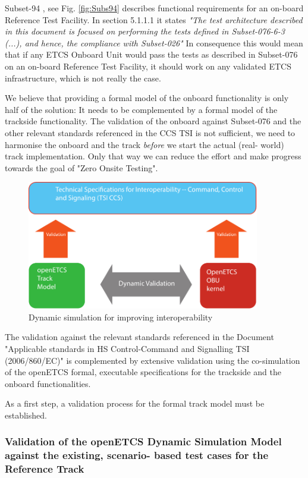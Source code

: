 \documentclass{template/openetcs_article}
\begin{document}
Subset-94 \cite{Subset094}, see Fig. \ref{fig:Subs94} describes functional requirements for an on-board Reference Test Facility. In section 5.1.1.1 it states \emph{"The test architecture described in this document is focused on performing the tests defined in Subset-076-6-3 (...), and hence, the compliance with Subset-026"} In consequence this would mean that if any ETCS Onboard Unit would pass the tests as described in Subset-076 \cite{Subset076} on an on-board Reference Test Facility, it should work on any validated ETCS infrastructure, which is not really the case.

We believe that providing a formal model of the onboard functionality is only half of the solution: It needs to be complemented by a formal model of the trackside functionality. The validation of the onboard against Subset-076 and the other relevant standards referenced in the CCS TSI is not sufficient, we need to harmonise the onboard and the track \emph{before} we start the actual (real- world) track implementation. Only that way we can reduce the effort and make progress towards the goal of "Zero Onsite Testing".

\begin{figure}[H]
 \centering
  \includegraphics[width=4in]{images/DynamicSimulationForInterOp}
  \caption{Dynamic simulation for improving interoperability}
   \label{fig:InterOpDynSim}
\end{figure}

The validation against the relevant standards referenced in the Document "Applicable standards in HS Control-Command and Signalling TSI (2006/860/EC)" \cite{CCS-TSI} is complemented by extensive validation using the co-simulation of the openETCS formal, executable specifications for the trackside and the onboard functionalities. 

As a first step, a validation process for the formal track model must be established. 


\subsubsection{Validation of the openETCS Dynamic Simulation Model against the existing, scenario- based test cases for the Reference Track}
\end{document}
